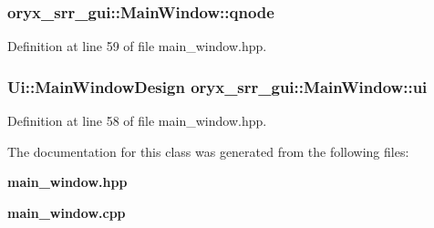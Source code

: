 \subsubsection[{qnode}]{ {\bf oryx\-\_\-srr\-\_\-gui\-::\-Main\-Window\-::qnode}\hspace{0.3cm}{\ttfamily  [private]}}\label{classoryx__srr__gui_1_1MainWindow_a9ec4eebaba280008a644bc994e3a2c2b}


\-Definition at line 59 of file main\-\_\-window.\-hpp.

\subsubsection[{ui}]{\setlength{\rightskip}{0pt plus 5cm}\-Ui\-::\-Main\-Window\-Design {\bf oryx\-\_\-srr\-\_\-gui\-::\-Main\-Window\-::ui}\hspace{0.3cm}{\ttfamily  [private]}}\label{classoryx__srr__gui_1_1MainWindow_a1793f5a07bbfb5e354f48eb2fd08e5e9}


\-Definition at line 58 of file main\-\_\-window.\-hpp.



\-The documentation for this class was generated from the following files\-:\begin{DoxyCompactItemize}
\item 
{\bf main\-\_\-window.\-hpp}\item 
{\bf main\-\_\-window.\-cpp}\end{DoxyCompactItemize}

